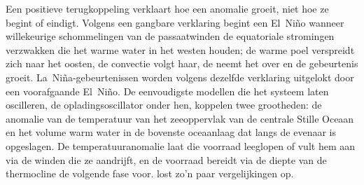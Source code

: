 \begin{omfigure}
\centering
{}
\par{}
\end{omfigure}

Een positieve terugkoppeling verklaart hoe een anomalie groeit, niet hoe ze begint of eindigt. Volgens een gangbare verklaring
begint een El~Niño wanneer willekeurige schommelingen van de passaatwinden de equatoriale stromingen verzwakken die
het warme water in het westen houden; de warme poel verspreidt zich naar het oosten, de convectie volgt haar, de
 neemt het over en de gebeurtenis groeit. La~Niña-gebeurtenissen worden volgens dezelfde verklaring
uitgelokt door een voorafgaande El~Niño. De eenvoudigste modellen die het systeem laten oscilleren, de
opladingsoscillator onder hen, koppelen twee grootheden: de anomalie van de temperatuur van het zeeoppervlak van de centrale
Stille Oceaan en het volume warm water in de bovenste oceaanlaag dat langs de evenaar is opgeslagen. De
temperatuuranomalie laat die voorraad leeglopen of vult hem aan via de winden die ze aandrijft, en de voorraad bereidt via de
diepte van de thermocline de volgende fase voor.  lost
zo'n paar vergelijkingen op.

